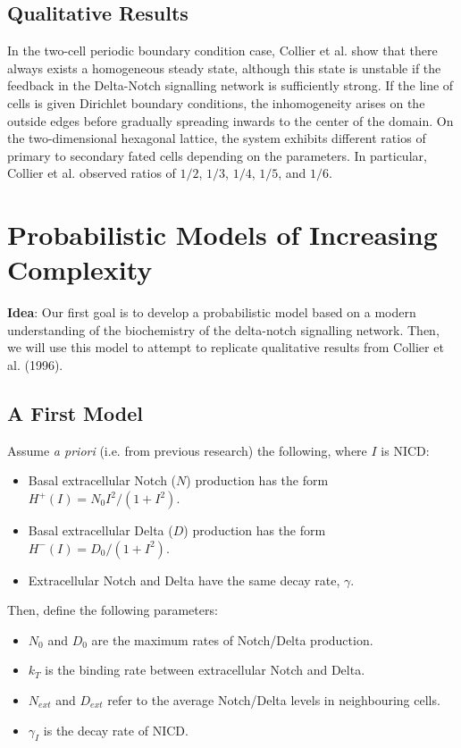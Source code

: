 \documentclass{article}
\begin{document}
\begin{flushleft}
\subsection{Qualitative Results}

In the two-cell periodic boundary condition case, Collier et al. show that there always exists a homogeneous steady state, although this state is unstable if the feedback in the Delta-Notch signalling network is sufficiently strong. If the line of cells is given Dirichlet boundary conditions, the inhomogeneity arises on the outside edges before gradually spreading inwards to the center of the domain. On the two-dimensional hexagonal lattice, the system exhibits different ratios of primary to secondary fated cells depending on the parameters. In particular, Collier et al. observed ratios of $1/2$, $1/3$, $1/4$, $1/5$, and $1/6$.

\section{Probabilistic Models of Increasing Complexity}

\textbf{Idea}: Our first goal is to develop a probabilistic model based on a modern understanding of the biochemistry of the delta-notch signalling network. Then, we will use this model to attempt to replicate qualitative results from Collier et al. (1996).

\subsection{A First Model}

Assume \emph{a priori} (i.e. from previous research) the following, where $I$ is NICD:

\begin{itemize}
  \item Basal extracellular Notch ($N$) production has the form $H^{+}(I) = N_{0}I^2/(1 + I^2)$. 
  \item Basal extracellular Delta ($D$) production has the form $H^{-}(I) = D_{0}/(1 + I^2)$.
  \item Extracellular Notch and Delta have the same decay rate, $\gamma$.
\end{itemize}

Then, define the following parameters:

\begin{itemize}
  \item $N_{0}$ and $D_{0}$ are the maximum rates of Notch/Delta production.
  \item $k_{T}$ is the binding rate between extracellular Notch and Delta.
  \item $N_{ext}$ and $D_{ext}$ refer to the average Notch/Delta levels in neighbouring cells.
  \item $\gamma_{I}$ is the decay rate of NICD.
\end{itemize}


\end{flushleft}
\end{document}
